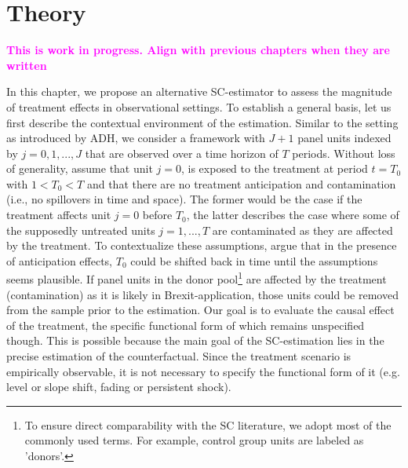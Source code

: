 \section{Theory}
\textcolor{magenta}{\textbf{This is work in progress. Align with previous chapters when they are written}}


\begin{comment}
\textcolor{magenta}{\textbf{What must be clear by now
	 \begin{itemize}
	 	\item Consider case without covariates
	 	\item Make clear that SC is a weighted average of the donors
	 \end{itemize}}}
\end{comment}
In this chapter, we propose an alternative \ac{SC}-estimator to assess the magnitude of treatment effects in observational settings. To establish a general basis, let us first describe the contextual environment of the estimation. Similar to the setting as introduced by \ac{ADH}, we consider a framework with $J+1$ panel units indexed by $j = 0,1, ..., J$ that are observed over a time horizon of $T$ periods. Without loss of generality, assume that unit $j = 0$, is exposed to the treatment at period $t = T_0$ with $1 < T_0 < T$ and that there are no treatment anticipation and contamination (i.e., no spillovers in time and space). The former would be the case if the treatment affects unit $j = 0$ before $T_0$, the latter describes the case where some of the supposedly untreated units $j = 1,...,T$ are contaminated as they are affected by the treatment. To contextualize these assumptions, \cite{abadie:2010} argue that in the presence of anticipation effects, $T_0$ could be shifted back in time until the assumptions seems plausible. If panel units in the donor pool\footnote{To ensure direct comparability with the \ac{SC} literature, we adopt most of the commonly used terms. For example, control group units are labeled as 'donors'.} are affected by the treatment (contamination) as it is likely in Brexit-application, those units could be removed from the sample prior to the estimation. Our goal is to evaluate the causal effect of the treatment, the specific functional form of which remains unspecified though. This is possible because the main goal of the \ac{SC}-estimation lies in the precise estimation of the counterfactual. Since the treatment  scenario is empirically observable, it is not necessary to specify the functional form of it (e.g. level or slope shift, fading or persistent shock).

